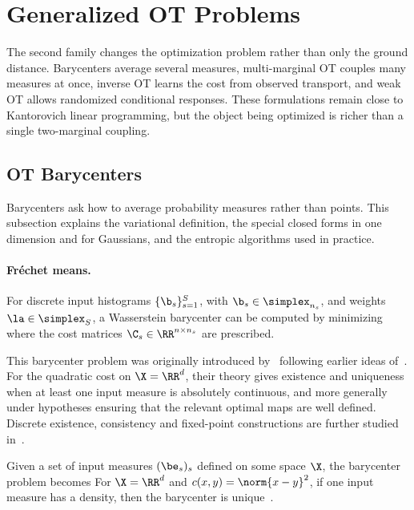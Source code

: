 
\section{Generalized OT Problems}
\label{sec-generalized-ot-problems}

The second family changes the optimization problem rather than only the ground distance. Barycenters average several measures, multi-marginal OT couples many measures at once, inverse OT learns the cost from observed transport, and weak OT allows randomized conditional responses. These formulations remain close to Kantorovich linear programming, but the object being optimized is richer than a single two-marginal coupling.

\subsection{OT Barycenters}
\label{sec-barycenters}

Barycenters ask how to average probability measures rather than points. This subsection explains the variational definition, the special closed forms in one dimension and for Gaussians, and the entropic algorithms used in practice.

\paragraph{Fr\'echet means.}

For discrete input histograms $\{\b_s\}_{s=1}^S$, with $\b_s \in \simplex_{n_s}$, and weights $\la \in \simplex_S$, a Wasserstein barycenter can be computed by minimizing
where the cost matrices $\C_s \in \RR^{n \times n_s}$ are prescribed.

This barycenter problem was originally introduced by~\cite{Carlier_wasserstein_barycenter} following earlier ideas of~\cite{carlierekelandmatching}. For the quadratic cost on $\X=\RR^d$, their theory gives existence and uniqueness when at least one input measure is absolutely continuous, and more generally under hypotheses ensuring that the relevant optimal maps are well defined. Discrete existence, consistency and fixed-point constructions are further studied in~\cite{anderes2016discrete,alvarez2016fixed,leGouic2016existence}.

Given a set of input measures $(\be_s)_s$ defined on some space $\X$, the barycenter problem becomes
For $\X=\RR^d$ and $c(x,y)=\norm{x-y}^2$, if one input measure has a density, then the barycenter is unique~\cite{Carlier_wasserstein_barycenter}.

